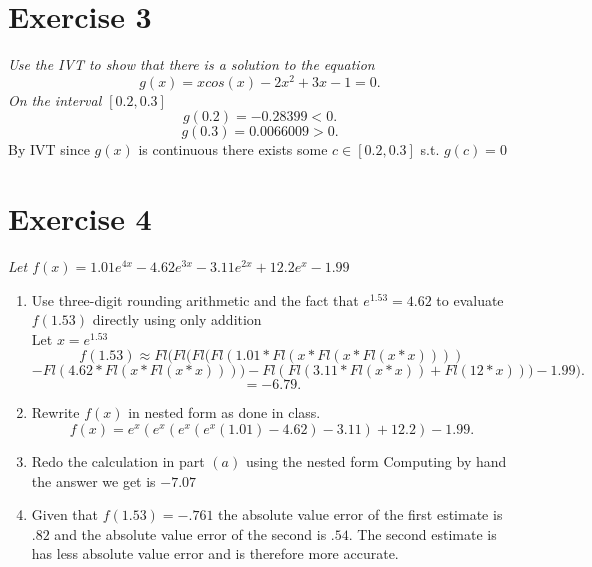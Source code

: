 \documentclass{amsart}
\begin{document}
    \section{Exercise 3}
    \emph{Use the IVT to show that there is a solution to the equation
        \[
        g(x) = xcos(x) - 2x^{2} + 3x -1 = 0
        .\] 
        On the interval $[0.2, 0.3]$
    }
    \[
    g(0.2) = -0.28399 < 0
    .\] 
    \[
    g(0.3) = 0.0066009 > 0
    .\] 
    By IVT since $g(x)$ is continuous there exists some $c \in [0.2, 0.3]$ s.t. $g(c) = 0$
    \section{Exercise 4}
    \emph{Let $f(x) = 1.01e^{4x} - 4.62e^{3x} - 3.11e^{2x} + 12.2e^{x} - 1.99$}
        \begin{enumerate}
            \item Use three-digit rounding arithmetic and the fact that $e^{1.53} = 4.62$ to evaluate $f(1.53)$ directly using
                only addition\\
                Let $x = e^{1.53}$ 
                \[
                f(1.53) \approx Fl(Fl(Fl(Fl(1.01*Fl(x*Fl(x*Fl(x*x)))) 
                \]
                \[ 
                - Fl(4.62*Fl(x*Fl(x*x))))-Fl(Fl(3.11*Fl(x*x))+Fl(12*x))) - 1.99)
                .\] 
                \[
                = -6.79
                .\] 
            \item Rewrite $f(x)$ in nested form as done in class.
                \[
                f(x) = e^{x}(e^{x}(e^{x}(e^{x}(1.01) - 4.62) - 3.11) + 12.2) - 1.99
                .\] 
            \item Redo the calculation in part $(a)$ using the nested form
                Computing by hand the answer we get is
                $-7.07$
            \item Given that  $f(1.53) = -.761$ the absolute value error of the first estimate is  $.82$ and the absolute value error of the second is
                $.54$. The second estimate is has less absolute value error and is therefore more accurate.
        \end{enumerate}
\end{document}
